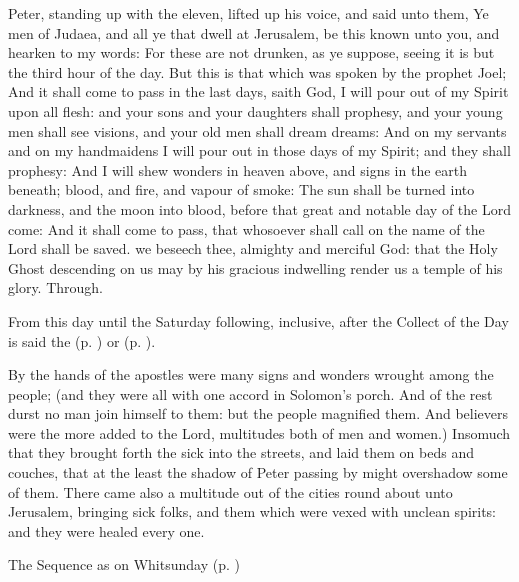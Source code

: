  Peter, standing up with the eleven, lifted up his voice, and said unto them, Ye men of Judaea, and all ye that dwell at Jerusalem, be this known unto you, and hearken to my words: For these are not drunken, as ye suppose, seeing it is but the third hour of the day. But this is that which was spoken by the prophet Joel; And it shall come to pass in the last days, saith God, I will pour out of my Spirit upon all flesh: and your sons and your daughters shall prophesy, and your young men shall see visions, and your old men shall dream dreams: And on my servants and on my handmaidens I will pour out in those days of my Spirit; and they shall prophesy: And I will shew wonders in heaven above, and signs in the earth beneath; blood, and fire, and vapour of smoke: The sun shall be turned into darkness, and the moon into blood, before that great and notable day of the Lord come: And it shall come to pass, that whosoever shall call on the name of the Lord shall be saved.
\collect
{} we beseech thee, almighty and merciful God: that the Holy Ghost descending on us may by his gracious indwelling render us a temple of his glory. Through.
\begin{rubric}
    From this day until the Saturday following, inclusive, after the Collect of the Day is said the   (p. \pageref{SPAgainst}) or  (p. \pageref{SPChiefBishop}).
\end{rubric}
 By the hands of the apostles were many signs and wonders wrought among the people; (and they were all with one accord in Solomon's porch. And of the rest durst no man join himself to them: but the people magnified them. And believers were the more added to the Lord, multitudes both of men and women.) Insomuch that they brought forth the sick into the streets, and laid them on beds and couches, that at the least the shadow of Peter passing by might overshadow some of them. There came also a multitude out of the cities round about unto Jerusalem, bringing sick folks, and them which were vexed with unclean spirits: and they were healed every one.
\begin{rubric}
{The Sequence as on Whitsunday (p. \pageref{WhitSeq})}
\end{rubric}
